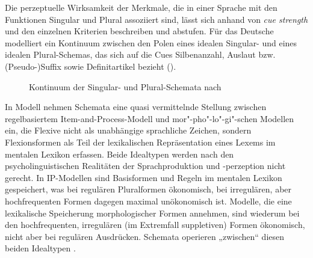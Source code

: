 Die perzeptuelle Wirksamkeit der Merkmale, die in einer Sprache mit den Funktionen Singular und Plural assoziiert sind, lässt sich anhand von \textit{cue strength} und den einzelnen Kriterien beschreiben und abstufen. Für das Deutsche modelliert \citet{Köpcke1988, Köpcke1993} ein Kontinuum zwischen den Polen eines idealen Singular- und eines idealen Plural-Schemas, das sich auf die Cues Silbenanzahl, Auslaut bzw. (Pseudo-)Suffix sowie Definitartikel bezieht ().


\begin{figure}
\caption{Kontinuum der Singular- und Plural-Schemata nach \textcites[332]{Köpcke1988}[88]{Köpcke1993}}
\label{fig:2}
\end{figure}

In  Modell nehmen Schemata eine quasi vermittelnde Stellung zwischen regelbasiertem Item-and-Process-Modell und mor"-pho"-lo"-gi"-schen Modellen ein, die Flexive nicht als unabhängige sprachliche Zeichen, sondern Flexionsformen als Teil der lexikalischen Repräsentation eines Lexems im mentalen Lexikon erfassen. Beide Idealtypen werden nach \citet[98--100]{Köpcke1993} den psycholinguistischen Realitäten der Sprachproduktion und -perzeption nicht gerecht. In IP-Modellen sind Basisformen und Regeln im mentalen Lexikon gespeichert, was bei regulären Pluralformen ökonomisch, bei irregulären, aber hochfrequenten Formen dagegen maximal unökonomisch ist. Modelle, die eine lexikalische Speicherung morphologischer Formen annehmen, sind wiederum bei den hochfrequenten, irregulären (im Extremfall suppletiven) Formen ökonomisch, nicht aber bei regulären Ausdrücken. Schemata operieren „zwischen“ diesen beiden Idealtypen \citep[100]{Köpcke1993}.

